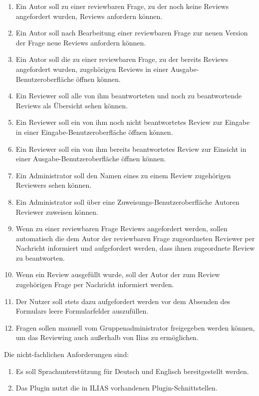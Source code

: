\documentclass[a4paper]{scrreprt}
\begin{document}
\begin{enumerate}[label= FA \arabic*:]
\item Ein Autor soll zu einer reviewbaren Frage, zu der noch keine Reviews angefordert wurden, Reviews anfordern können.
\item Ein Autor soll nach Bearbeitung einer reviewbaren Frage zur neuen Version der Frage neue Reviews  anfordern können.
\item Ein Autor soll die zu einer reviewbaren Frage, zu der bereits Reviews angefordert wurden, zugehörigen Reviews in einer Ausgabe-Benutzeroberfläche öffnen können.
\item Ein Reviewer soll alle von ihm beantworteten und noch zu beantwortende Reviews als Übersicht sehen können.
\item Ein Reviewer soll ein von ihm noch nicht beantwortetes Review zur Eingabe in einer Eingabe-Benutzeroberfläche öffnen können.
\item Ein Reviewer soll ein von ihm bereits beantwortetes Review zur Einsicht in einer Ausgabe-Benutzeroberfläche öffnen können.
\item Ein Administrator soll den Namen eines zu einem Review zugehörigen Reviewers sehen können.
\item Ein Administrator soll über eine Zuweisungs-Benutzeroberfläche Autoren Reviewer zuweisen können.
\item Wenn zu einer reviewbaren Frage Reviews angefordert werden, sollen automatisch die dem Autor der reviewbaren Frage zugeordneten Reviewer per Nachricht informiert und aufgefordert werden, dass ihnen zugeordnete Review zu beantworten.
\item Wenn ein Review ausgefüllt wurde, soll der Autor der zum Review zugehörigen Frage per Nachricht informiert werden.
\item Der Nutzer soll stets dazu aufgefordert werden  vor dem Absenden des Formulars  leere Formularfelder auszufüllen.  
\item Fragen sollen manuell vom Gruppenadministrator freigegeben werden können, um das Reviewing auch außerhalb von Ilias zu ermöglichen.
\end{enumerate}


Die nicht-fachlichen Anforderungen sind:
\begin{enumerate}[label=NFA \arabic*:]
\item Es soll Sprachunterstützung für Deutsch und Englisch bereitgestellt werden.
\item Das Plugin nutzt die in ILIAS vorhandenen Plugin-Schnittstellen.
\end{enumerate}
\end{document}
